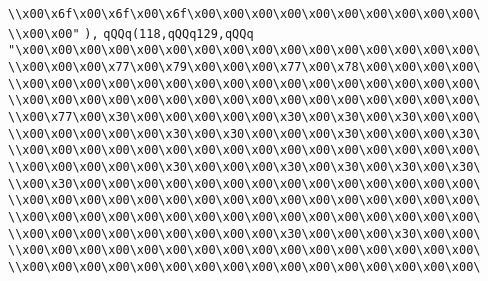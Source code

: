 \verb|\\x00\x6f\x00\x6f\x00\x6f\x00\x00\x00\x00\x00\x00\x00\x00\x00\x00\|\newline
\verb|\\x00\x00"|\newline
\verb|),|\newline
\verb|qQQq(118,qQQq129,qQQq|\newline
\verb|"\x00\x00\x00\x00\x00\x00\x00\x00\x00\x00\x00\x00\x00\x00\x00\x00\|\newline
\verb|\\x00\x00\x00\x77\x00\x79\x00\x00\x00\x77\x00\x78\x00\x00\x00\x00\|\newline
\verb|\\x00\x00\x00\x00\x00\x00\x00\x00\x00\x00\x00\x00\x00\x00\x00\x00\|\newline
\verb|\\x00\x00\x00\x00\x00\x00\x00\x00\x00\x00\x00\x00\x00\x00\x00\x00\|\newline
\verb|\\x00\x77\x00\x30\x00\x00\x00\x00\x00\x30\x00\x30\x00\x30\x00\x00\|\newline
\verb|\\x00\x00\x00\x00\x00\x30\x00\x30\x00\x00\x00\x30\x00\x00\x00\x30\|\newline
\verb|\\x00\x00\x00\x00\x00\x00\x00\x00\x00\x00\x00\x00\x00\x00\x00\x00\|\newline
\verb|\\x00\x00\x00\x00\x00\x30\x00\x00\x00\x30\x00\x30\x00\x30\x00\x30\|\newline
\verb|\\x00\x30\x00\x00\x00\x00\x00\x00\x00\x00\x00\x00\x00\x00\x00\x00\|\newline
\verb|\\x00\x00\x00\x00\x00\x00\x00\x00\x00\x00\x00\x00\x00\x00\x00\x00\|\newline
\verb|\\x00\x00\x00\x00\x00\x00\x00\x00\x00\x00\x00\x00\x00\x00\x00\x00\|\newline
\verb|\\x00\x00\x00\x00\x00\x00\x00\x00\x00\x30\x00\x00\x00\x30\x00\x00\|\newline
\verb|\\x00\x00\x00\x00\x00\x00\x00\x00\x00\x00\x00\x00\x00\x00\x00\x00\|\newline
\verb|\\x00\x00\x00\x00\x00\x00\x00\x00\x00\x00\x00\x00\x00\x00\x00\x00\|\newline
